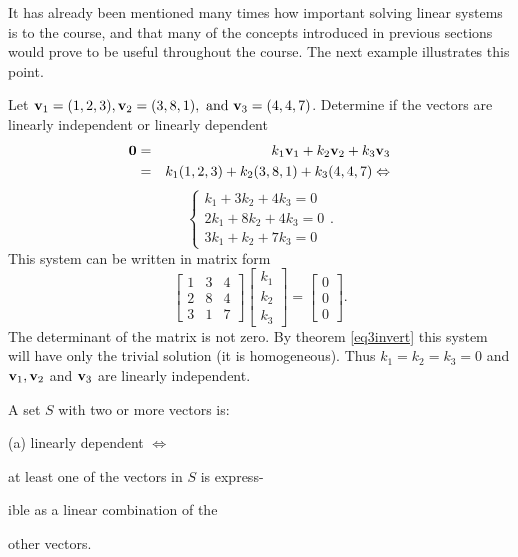 It has already been mentioned many times how important solving
linear systems is to the course, and that many of the concepts
introduced in previous sections would prove to be useful
throughout the course. The next example illustrates this point.

\begin{example}
\label{exam5.li}  Let ${\bf v}_1=(1,2,3), {\bf v}_2=(3,8,1),
\mbox{ and } {\bf v}_3=(4,4,7)$. Determine if the vectors are
linearly independent or linearly dependent
\begin{eqnarray*}
{\bf 0}&=&k_1{\bf v}_1+k_2{\bf v}_2+k_3{\bf v}_3\\
&=&k_1(1,2,3)+k_2(3,8,1)+k_3(4,4,7) \Leftrightarrow
\end{eqnarray*} $$\left \{
\begin{array}{r} k_1+3k_2+4k_3=0\\ 2k_1+8k_2+4k_3=0\\
3k_1+k_2+7k_3=0 \end{array} \right . . $$ This system can be
written in matrix form $$\left [\begin{array}{rrr}
        1&3&4\\
        2&8&4\\
        3&1&7 \end{array} \right ]
         \left [ \begin{array}{c}
                       k_1\\
                       k_2\\
                       k_3 \end{array} \right ]=
         \left [ \begin{array}{c}
                    0\\0\\0 \end{array} \right ].$$
The determinant of the matrix is not zero.  By theorem
\ref{eq3invert} this system will have only the trivial solution
(it is homogeneous).  Thus $k_1=k_2=k_3=0$ and ${\bf v}_1,{\bf
v}_2$ and ${\bf v}_3$ are linearly independent.
\end{example}

\noindent A set $S$ with two or more vectors is:

\parbox{2in}{(a) linearly dependent $\Leftrightarrow$}
\parbox[t]{4in}{at least one of the vectors in $S$ is express-

ible as a linear
combination of the

other vectors.}\\

